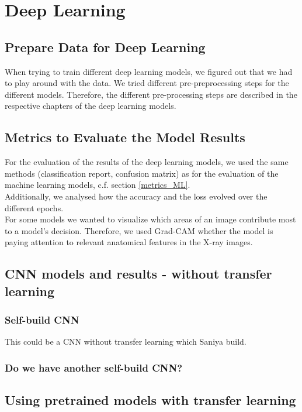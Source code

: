 \documentclass{article}
\begin{document}
\section{Deep Learning}

\subsection{Prepare Data for Deep Learning}
When trying to train different deep learning models, we figured out that we had to play around with the data. We tried different pre-preprocessing steps for the different models. Therefore, the different pre-processing steps are described in the respective chapters of the deep learning models.

\subsection{Metrics to Evaluate the Model Results}
For the evaluation of the results of the deep learning models, we used the same methods (classification report, confusion matrix) as for the evaluation of the machine learning models, c.f. section \ref{metrics_ML}. \\
Additionally, we analysed how the accuracy and the loss evolved over the different epochs. \\

For some models we wanted to visualize which areas of an image contribute most to a model's decision. Therefore, we used Grad-CAM whether the model is paying attention to relevant anatomical features in the X-ray images.

\subsection{CNN models and results - without transfer learning}
\subsubsection{Self-build CNN}
This could be a CNN without transfer learning which Saniya build.

\subsubsection{Do we have another self-build CNN?}

\subsection{Using pretrained models with transfer learning}
\end{document}
